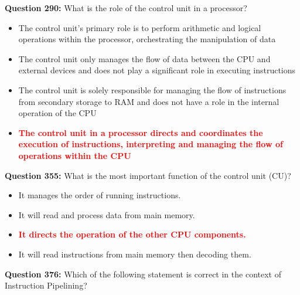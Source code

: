 \documentclass[12pt,a4paper]{article}
\begin{document}
\vspace{0.5cm}

\vspace{0.5cm}

\textbf{Question 290:} What is the role of the control unit in a processor?

\begin{itemize}
    \item[\textbf{A.}] The control unit's primary role is to perform arithmetic and logical operations within the processor, orchestrating the manipulation of data
    \item[\textbf{B.}] The control unit only manages the flow of data between the CPU and external devices and does not play a significant role in executing instructions
    \item[\textbf{C.}] The control unit is solely responsible for managing the flow of instructions from secondary storage to RAM and does not have a role in the internal operation of the CPU
    \item[\textbf{D.}] \textcolor{red}{\textbf{The control unit in a processor directs and coordinates the execution of instructions, interpreting and managing the flow of operations within the CPU}}
\end{itemize}

\vspace{0.5cm}

\vspace{0.5cm}

\textbf{Question 355:} What is the most important function of the control unit (CU)?

\begin{itemize}
    \item[\textbf{A.}] It manages the order of running instructions.
    \item[\textbf{B.}] It will read and process data from main memory.
    \item[\textbf{C.}] \textcolor{red}{\textbf{It directs the operation of the other CPU components.}}
    \item[\textbf{D.}] It will read instructions from main memory then decoding them.
\end{itemize}

\vspace{0.5cm}

\vspace{0.5cm}

\textbf{Question 376:} Which of the following statement is correct in the context of Instruction Pipelining?
\end{document}
